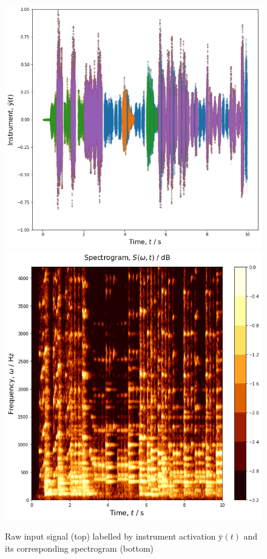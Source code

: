 \documentclass{article}[12pt]
\numberwithin{equation}{section}
\begin{document}
\begin{figure}[H]
\centering{}
\captionsetup{justification=centering}
\includegraphics[scale=0.5]{signal}
\includegraphics[scale=0.5]{spectrogram}
\caption{
Raw input signal (top) labelled by instrument activation $\bar{\mathrm{y}}(t)$
and its corresponding spectrogram (bottom)
}
\label{fig:methods}
\end{figure}
\end{document}
